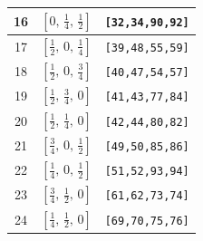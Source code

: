 \documentclass[fleqn,8pt]{jsarticle}
\begin{document}
\begin{longtable}{ccc}
16 & $\left[ 0,\, \frac{1}{4},\, \frac{1}{2} \right]$ & {\tt [32,34,90,92]} \\ \hline
17 & $\left[ \frac{1}{2},\, 0,\, \frac{1}{4} \right]$ & {\tt [39,48,55,59]} \\ \hline
18 & $\left[ \frac{1}{2},\, 0,\, \frac{3}{4} \right]$ & {\tt [40,47,54,57]} \\ \hline
19 & $\left[ \frac{1}{2},\, \frac{3}{4},\, 0 \right]$ & {\tt [41,43,77,84]} \\ \hline
20 & $\left[ \frac{1}{2},\, \frac{1}{4},\, 0 \right]$ & {\tt [42,44,80,82]} \\ \hline
21 & $\left[ \frac{3}{4},\, 0,\, \frac{1}{2} \right]$ & {\tt [49,50,85,86]} \\ \hline
22 & $\left[ \frac{1}{4},\, 0,\, \frac{1}{2} \right]$ & {\tt [51,52,93,94]} \\ \hline
23 & $\left[ \frac{3}{4},\, \frac{1}{2},\, 0 \right]$ & {\tt [61,62,73,74]} \\ \hline
24 & $\left[ \frac{1}{4},\, \frac{1}{2},\, 0 \right]$ & {\tt [69,70,75,76]} \\
\end{longtable}
\renewcommand{\arraystretch}{1.2}
\end{document}
